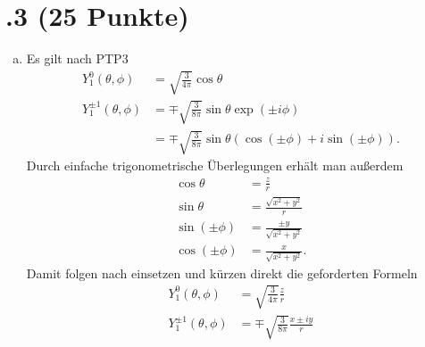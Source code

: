 \section*{\nr.3 \titthree (25 Punkte)}
\begin{enumerate}[(a)]
\item Es gilt nach PTP3
\begin{align}
  Y_1^0\left(\theta,\phi\right)&=\sqrt{\frac{3}{4\pi}}\cos\theta\\
  Y_1^{\pm1}\left(\theta,\phi\right)&=\mp\sqrt{\frac{3}{8\pi}}\sin\theta\exp\left(\pm i\phi\right)\\
  &=\mp\sqrt{\frac{3}{8\pi}}\sin\theta\left(\cos(\pm\phi)+i\sin(\pm\phi)\right).
\end{align}
Durch einfache trigonometrische Überlegungen erhält man außerdem
\begin{align}
  \cos\theta&=\frac{z}{r}\\
  \sin\theta&=\frac{\sqrt{x^2+y^2}}{r}\\
  \sin(\pm\phi)&=\frac{\pm y}{\sqrt{x^2+y^2}}\\
  \cos(\pm\phi)&=\frac{x}{\sqrt{x^2+y^2}}.
\end{align}
Damit folgen nach einsetzen und kürzen direkt die geforderten Formeln
\begin{align}
  Y_1^0(\theta,\phi)&=\sqrt{\frac{3}{4\pi}}\frac{z}{r}\\
  Y_1^{\pm 1}(\theta,\phi)&=\mp \sqrt{\frac{3}{8\pi}}\frac{x\pm iy}{r}
\end{align}

\end{enumerate}